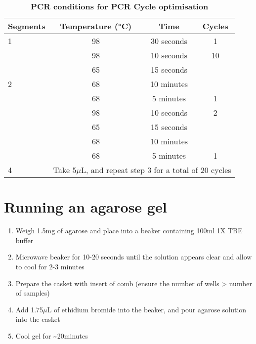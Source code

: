 \vspace{1cm}
\begin{table}[h]
	\centering
	\caption[PCR conditions for PCR Cycle optimisations]%
	{\textbf{PCR conditions for PCR Cycle optimisation}}
	\label{tab:PCR_condition_cycleoptim}
	\begin{tabularx}{0.8\textwidth}{lccc}
		\toprule
		Segments           & Temperature (°C)             & Time                  & Cycles            \\ \midrule
		1                  & 98                           & 30 seconds            & 1                 \\
		\multirow{5}{*}{2} & 98                           & 10 seconds            & 10                \\
		& 65                           & 15 seconds            &                   \\
		& 68                           & 10 minutes            &                   \\
		& 68                           & 5 minutes             & 1                 \\
		\multirow{4}{*}{3} & 98                           & 10 seconds            & 2                 \\
		& 65                           & 15 seconds            &                   \\
		& 68                           & 10 minutes            &                   \\
		& 68                           & 5 minutes             & 1                 \\
		4                  & \multicolumn{3}{c}{Take 5$\mu$L, and repeat step 3 for a total of 20 cycles} \\
		\bottomrule
	\end{tabularx}
\end{table}

	
\section{Running an agarose gel}
\label{Isoseq_Protocol_running_agarose_gel}
\begin{enumerate}
	\item Weigh 1.5mg of agarose and place into a beaker containing 100ml 1X TBE buffer 
	\item Microwave beaker for 10-20 seconds until the solution appears clear and allow to cool for 2-3 minutes 
	\item Prepare the casket with insert of comb (ensure the number of wells > number of samples)
	\item Add 1.75$\mu$L of ethidium bromide into the beaker, and pour agarose solution into the casket 
	\item Cool gel for \textasciitilde20minutes
\end{enumerate} 

